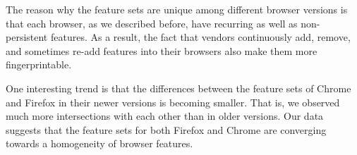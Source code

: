 The reason why the feature sets are unique among different browser
versions is that each browser, as we described before, have recurring
as well as non-persistent features. As a result, the fact that vendors
continuously add, remove, and sometimes re-add features into their
browsers also make them more fingerprintable.


One interesting trend is that the differences between the feature sets
of Chrome and Firefox in their newer versions is becoming smaller.
That is, we observed much more intersections with each other than in
older versions. Our data suggests that the feature sets for both
Firefox and Chrome are converging towards a homogeneity of browser
features.
